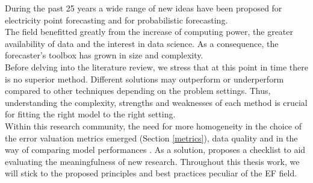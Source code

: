 During the past 25 years %
a wide range of new ideas have been proposed for electricity point forecasting and for probabilistic forecasting.
\\
The field benefitted greatly from the increase of computing power, the greater availability of data and the interest in data science.
As a consequence, the forecaster's toolbox has grown in size and complexity.
\\
Before delving into the literature review, we stress that at this point in time there is no superior method. Different solutions may outperform or underperform compared to other techniques depending on the problem settings. Thus, understanding the complexity, strengths and weaknesses of each method is crucial for fitting the right model to the right setting.
\\
Within this research community, the need for more homogeneity in the choice of the error valuation metrics emerged (Section \ref{metrics}), data quality and in the way of comparing model performances \cite{EPF_review}. As a solution, \cite{lago} proposes a checklist to aid evaluating the meaningfulness of new research. Throughout this thesis work, we will stick to the proposed principles and best practices peculiar of the EF field.

